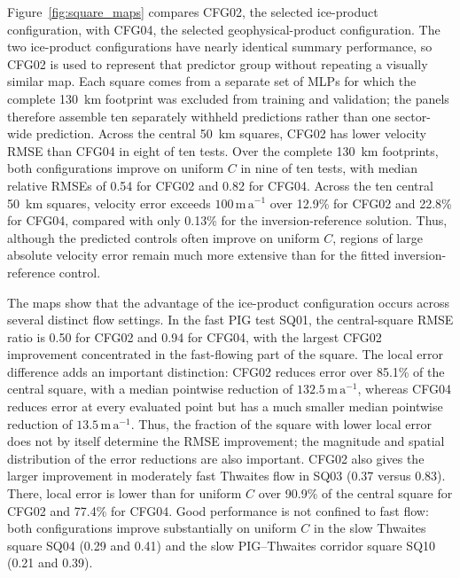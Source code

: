 \documentclass[review,jog]{igs}
\begin{document}
Figure~\ref{fig:square_maps} compares CFG02, the selected ice-product configuration, with CFG04, the selected geophysical-product configuration. The two ice-product configurations have nearly identical summary performance, so CFG02 is used to represent that predictor group without repeating a visually similar map. Each square comes from a separate set of MLPs for which the complete 130~km footprint was excluded from training and validation; the panels therefore assemble ten separately withheld predictions rather than one sector-wide prediction. Across the central 50~km squares, CFG02 has lower velocity RMSE than CFG04 in eight of ten tests. Over the complete 130~km footprints, both configurations improve on uniform $C$ in nine of ten tests, with median relative RMSEs of 0.54 for CFG02 and 0.82 for CFG04. Across the ten central 50~km squares, velocity error exceeds $100\,\mathrm{m\,a^{-1}}$ over 12.9\% for CFG02 and 22.8\% for CFG04, compared with only 0.13\% for the inversion-reference solution. Thus, although the predicted controls often improve on uniform $C$, regions of large absolute velocity error remain much more extensive than for the fitted inversion-reference control.  %

The maps show that the advantage of the ice-product configuration occurs
across several distinct flow settings. In the fast PIG test SQ01, the
central-square RMSE ratio is 0.50 for CFG02 and 0.94 for CFG04, with the
largest CFG02 improvement concentrated in the fast-flowing part of the
square. The local error difference adds an important distinction: CFG02
reduces error over 85.1\% of the central square, with a median pointwise
reduction of $132.5\,\mathrm{m\,a^{-1}}$, whereas CFG04 reduces error at
every evaluated point but has a much smaller median pointwise reduction of
$13.5\,\mathrm{m\,a^{-1}}$. Thus, the fraction of the square with lower local error does not by itself
determine the RMSE improvement; the magnitude and spatial distribution of the
error reductions are also important. CFG02 also gives the larger improvement in moderately fast Thwaites flow in SQ03 (0.37 versus 0.83). There, local error is lower than for uniform $C$ over 90.9\% of the central square for CFG02 and 77.4\% for CFG04. Good performance is not confined to fast flow:
both configurations improve substantially on uniform $C$ in the slow
Thwaites square SQ04 (0.29 and 0.41) and the slow PIG--Thwaites corridor
square SQ10 (0.21 and 0.39).
\end{document}
